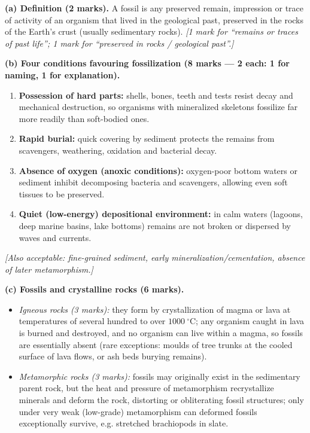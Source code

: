 \documentclass[11pt]{article}
\begin{document}
\begin{corrige}
\textbf{(a) Definition (2 marks).} A fossil is any preserved remain, impression or trace of activity of an organism that lived in the geological past, preserved in the rocks of the Earth's crust (usually sedimentary rocks). \emph{[1 mark for ``remains or traces of past life''; 1 mark for ``preserved in rocks / geological past''.]}

\textbf{(b) Four conditions favouring fossilization (8 marks — 2 each: 1 for naming, 1 for explanation).}
\begin{enumerate}
\item \textbf{Possession of hard parts:} shells, bones, teeth and tests resist decay and mechanical destruction, so organisms with mineralized skeletons fossilize far more readily than soft-bodied ones.
\item \textbf{Rapid burial:} quick covering by sediment protects the remains from scavengers, weathering, oxidation and bacterial decay.
\item \textbf{Absence of oxygen (anoxic conditions):} oxygen-poor bottom waters or sediment inhibit decomposing bacteria and scavengers, allowing even soft tissues to be preserved.
\item \textbf{Quiet (low-energy) depositional environment:} in calm waters (lagoons, deep marine basins, lake bottoms) remains are not broken or dispersed by waves and currents.
\end{enumerate}
\emph{[Also acceptable: fine-grained sediment, early mineralization/cementation, absence of later metamorphism.]}

\textbf{(c) Fossils and crystalline rocks (6 marks).}
\begin{itemize}
\item \emph{Igneous rocks (3 marks):} they form by crystallization of magma or lava at temperatures of several hundred to over $1000\ ^\circ\mathrm{C}$; any organism caught in lava is burned and destroyed, and no organism can live within a magma, so fossils are essentially absent (rare exceptions: moulds of tree trunks at the cooled surface of lava flows, or ash beds burying remains).
\item \emph{Metamorphic rocks (3 marks):} fossils may originally exist in the sedimentary parent rock, but the heat and pressure of metamorphism recrystallize minerals and deform the rock, distorting or obliterating fossil structures; only under very weak (low-grade) metamorphism can deformed fossils exceptionally survive, e.g. stretched brachiopods in slate.
\end{itemize}


\end{corrige}
\end{document}
